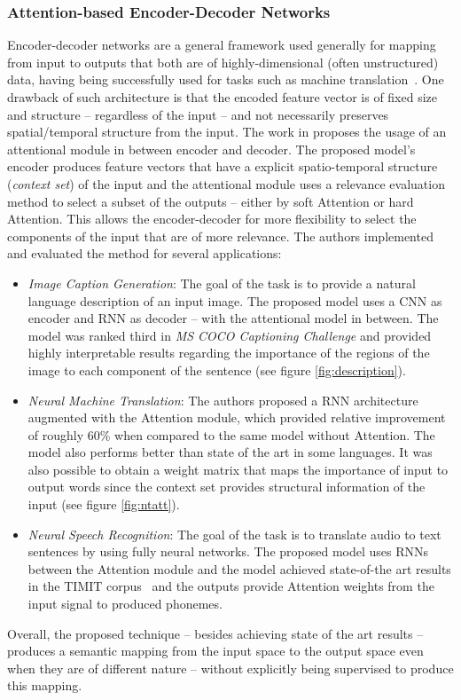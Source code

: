 \documentclass[12pt]{article}
\begin{document}
\subsubsection{Attention-based Encoder-Decoder Networks}
Encoder-decoder networks are a general framework used generally for mapping from input to outputs that both
are of highly-dimensional (often unstructured) data, having being successfully used for tasks such
as machine translation~\cite{ref:enc-dec-rnns}.
One drawback of such architecture is that the encoded feature vector is of fixed size and structure --
regardless of the input -- and not necessarily preserves spatial/temporal structure from the input.
The work in \cite{ref:enc-dec} proposes the usage of an attentional module in between encoder and decoder.
The proposed model's encoder produces feature vectors that have a explicit spatio-temporal structure
(\emph{context set}) of the input and the attentional module uses a relevance evaluation
method to select a subset of the outputs -- either by soft Attention or hard Attention.
This allows the encoder-decoder for more flexibility to select the components of the input that are of
more relevance.
The authors implemented and evaluated the method for several applications:
\begin{itemize}
    \item \emph{Image Caption Generation}: The goal of the task is to provide a natural language description
        of an input image.
        The proposed model uses a CNN as encoder and RNN as decoder -- with the attentional model in between.
        The model was ranked third in \emph{MS COCO Captioning Challenge} and provided highly interpretable
        results regarding the importance of the regions of the image to each component of the sentence
        (see figure \ref{fig:description}).
    \item \emph{Neural Machine Translation}: The authors proposed a RNN architecture
        augmented with the Attention module,
        which provided relative improvement of roughly 60\% when compared to the same model without Attention.
        The model also performs better than state of the art in some languages.
        It was also possible to obtain a weight matrix that maps the importance of input to output words
        since the context set provides structural information of the input (see figure \ref{fig:ntatt}).
    \item \emph{Neural Speech Recognition}: The goal of the task is to translate audio to text sentences by
        using fully neural networks.
        The proposed model uses RNNs between the Attention module and the model achieved state-of-the art
        results in the TIMIT corpus~\cite{ref:timit} and the outputs provide Attention weights from
        the input signal to produced phonemes.
\end{itemize}
Overall, the proposed technique -- besides achieving state of the art results --
produces a semantic mapping from the input space to the output space even when they are of different nature
-- without explicitly being supervised to produce this mapping.
\end{document}
